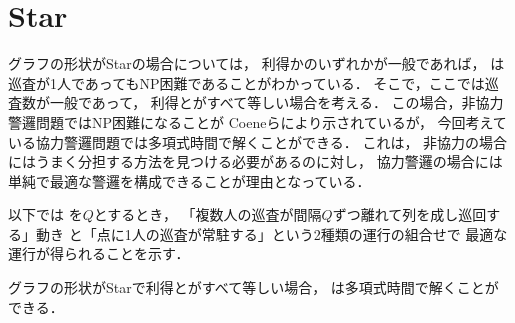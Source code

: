 
\section{Star}
グラフの形状がStarの場合については，
利得か{\timelimit}のいずれかが一般であれば，
{\patrolling}は巡査が1人であってもNP困難であることがわかっている\cite{coene2011charlemagne}．
そこで，ここでは巡査数が一般であって，
利得と{\timelimit}がすべて等しい場合を考える．
%
この場合，非協力警邏問題ではNP困難になることが
Coeneら\cite{coene2011charlemagne}により示されているが，
今回考えている協力警邏問題では多項式時間で解くことができる．
%
これは，
非協力の場合にはうまく分担する方法を見つける必要があるのに対し，
協力警邏の場合には単純で最適な警邏を構成できることが理由となっている．

以下では
{\timelimit}を$Q$とするとき，
「複数人の巡査が間隔$Q$ずつ離れて列を成し巡回する」動き
と「点に1人の巡査が常駐する」という2種類の運行の組合せで
最適な運行が得られることを示す．




\begin{theo}
    \label{theo:StarEqualProfitTimelimit}
    グラフの形状がStarで利得と{\timelimit}がすべて等しい場合，
    {\patrolling}は多項式時間で解くことができる．
\end{theo}


